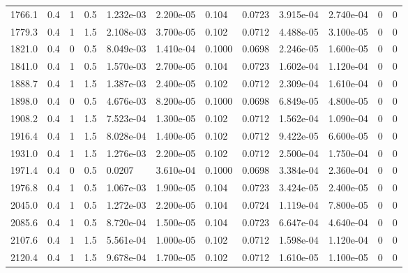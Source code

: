\documentclass[preview]{standalone}
\begin{document}
{{\begin{tabular}{L{1.2cm}C{1.2cm} C{0.3cm}C{0.5cm} C{1.4cm}C{1.4cm} C{1.4cm}C{1.4cm} C{1.6cm}C{1.6cm} C{1.6cm}C{1.6cm}}
  1766.1  &   0.4  & 1     & 0.5 &  1.232e-03  & 2.200e-05  &  0.104&   0.0723& 3.915e-04 & 2.740e-04   &  0 & 0  \\ 
  1779.3  &   0.4  & 1     & 1.5 &  2.108e-03  & 3.700e-05  &  0.102&   0.0712& 4.488e-05 & 3.100e-05   &  0 & 0  \\ 
  1821.0  &   0.4  & 0     & 0.5 &  8.049e-03  & 1.410e-04  &  0.1000&   0.0698& 2.246e-05 & 1.600e-05   &  0 & 0  \\ 
  1841.0  &   0.4  & 1     & 0.5 &  1.570e-03  & 2.700e-05  &  0.104&   0.0723& 1.602e-04 & 1.120e-04   &  0 & 0  \\ 
  1888.7  &   0.4  & 1     & 1.5 &  1.387e-03  & 2.400e-05  &  0.102&   0.0712& 2.309e-04 & 1.610e-04   &  0 & 0  \\ 
  1898.0  &   0.4  & 0     & 0.5 &  4.676e-03  & 8.200e-05  &  0.1000&   0.0698& 6.849e-05 & 4.800e-05   &  0 & 0  \\ 
  1908.2  &   0.4  & 1     & 1.5 &  7.523e-04  & 1.300e-05  &  0.102&   0.0712& 1.562e-04 & 1.090e-04   &  0 & 0  \\ 
  1916.4  &   0.4  & 1     & 1.5 &  8.028e-04  & 1.400e-05  &  0.102&   0.0712& 9.422e-05 & 6.600e-05   &  0 & 0  \\ 
  1931.0  &   0.4  & 1     & 1.5 &  1.276e-03  & 2.200e-05  &  0.102&   0.0712& 2.500e-04 & 1.750e-04   &  0 & 0  \\ 
  1971.4  &   0.4  & 0     & 0.5 &  0.0207  & 3.610e-04  &  0.1000&   0.0698& 3.384e-04 & 2.360e-04   &  0 & 0  \\ 
  1976.8  &   0.4  & 1     & 0.5 &  1.067e-03  & 1.900e-05  &  0.104&   0.0723& 3.424e-05 & 2.400e-05   &  0 & 0  \\ 
  2045.0  &   0.4  & 1     & 0.5 &  1.272e-03  & 2.200e-05  &  0.104&   0.0724& 1.119e-04 & 7.800e-05   &  0 & 0  \\ 
  2085.6  &   0.4  & 1     & 0.5 &  8.720e-04  & 1.500e-05  &  0.104&   0.0723& 6.647e-04 & 4.640e-04   &  0 & 0  \\ 
  2107.6  &   0.4  & 1     & 1.5 &  5.561e-04  & 1.000e-05  &  0.102&   0.0712& 1.598e-04 & 1.120e-04   &  0 & 0  \\ 
  2120.4  &   0.4  & 1     & 1.5 &  9.678e-04  & 1.700e-05  &  0.102&   0.0712& 1.610e-05 & 1.100e-05   &  0 & 0  \\ 
\hline 
\end{tabular} 

}}
\end{document}
